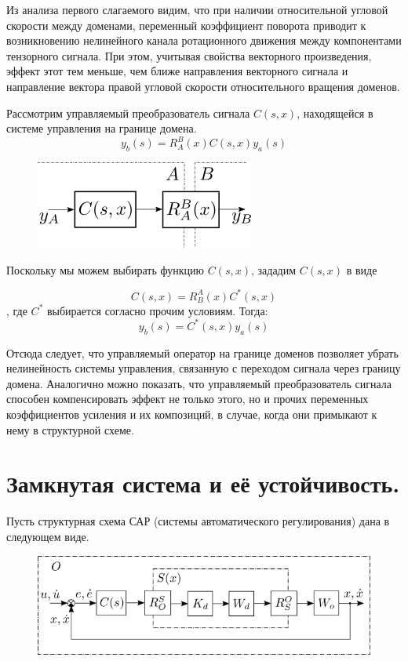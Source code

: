 \documentclass[a4paper]{article}
\begin{document}
Из анализа первого слагаемого видим, что при наличии относительной угловой скорости между доменами, переменный коэффициент поворота приводит к возникновению нелинейного канала ротационного движения между компонентами тензорного сигнала. При этом, учитывая свойства векторного произведения, эффект этот тем меньше, чем ближе направления векторного сигнала и направление вектора правой угловой скорости относительного вращения доменов.  

Рассмотрим управляемый преобразователь сигнала $C(s,x)$, находящейся в системе управления на границе домена.
\begin{equation} y_b(s) = R_A^B(x) C(s,x) y_a(s) \end{equation}

{
\begin{figure}[H]
\centering
\includegraphics{./src/domens.png}
\end{figure}
}

Поскольку мы можем выбирать функцию $C(s,x)$, зададим $C(s,x)$ в виде

\begin{equation} \label{kcomp} C(s,x) = R_B^A(x) C^*(s,x) \end{equation}
, где $C^*$ выбирается согласно прочим условиям. Тогда:
\begin{equation} y_b(s) = C^*(s,x) y_a(s) \end{equation} 

Отсюда следует, что управляемый оператор на границе доменов позволяет убрать нелинейность системы управления, связанную с переходом сигнала через границу домена. Аналогично можно показать, что управляемый преобразователь сигнала способен компенсировать эффект не только этого, но и прочих переменных коэффициентов усиления и их композиций, в случае, когда они примыкают к нему в структурной схеме.

\section{Замкнутая система и её устойчивость.}
Пусть структурная схема САР (системы автоматического регулирования) дана в следующем виде.

{
\begin{figure}[H]
\centering
\includegraphics{./src/sheme.png}
\end{figure}
}
\end{document}
